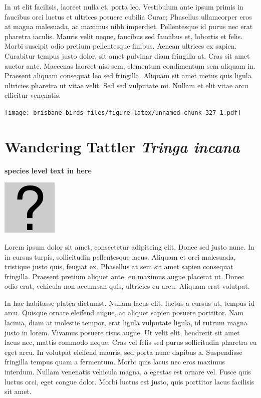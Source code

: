 \documentclass[]{book}
\let\origfigure\figure
\let\endorigfigure\endfigure
\renewenvironment{figure}[1][2] {
  \expandafter\origfigure\expandafter[H]
} {
  \endorigfigure
}
\begin{document}
In ut elit facilisis, laoreet nulla et, porta leo. Vestibulum ante ipsum
primis in faucibus orci luctus et ultrices posuere cubilia Curae;
Phasellus ullamcorper eros at magna malesuada, ac maximus nibh
imperdiet. Pellentesque id purus nec erat pharetra iaculis. Mauris velit
neque, faucibus sed faucibus et, lobortis et felis. Morbi suscipit odio
pretium pellentesque finibus. Aenean ultrices ex sapien. Curabitur
tempus justo dolor, sit amet pulvinar diam fringilla at. Cras sit amet
auctor ante. Maecenas laoreet nisi sem, elementum condimentum sem
aliquam in. Praesent aliquam consequat leo sed fringilla. Aliquam sit
amet metus quis ligula ultricies pharetra ut vitae velit. Sed sed
vulputate mi. Nullam et elit vitae arcu efficitur venenatis.

\begin{figure}
\centering
\texttt{[image: brisbane-birds\_files/figure-latex/unnamed-chunk-327-1.pdf]}
\caption{\label{fig:unnamed-chunk-327}insert figure caption}
\end{figure}

\section{\texorpdfstring{Wandering Tattler \emph{Tringa
incana}}{Wandering Tattler Tringa incana}}\label{wandering-tattler-tringa-incana}

\textbf{species level text in here}

\begin{figure}
\centering
\includegraphics{assets/missing.png}
\caption{No image for species}
\end{figure}

Lorem ipsum dolor sit amet, consectetur adipiscing elit. Donec sed justo
nunc. In in cursus turpis, sollicitudin pellentesque lacus. Aliquam et
orci malesuada, tristique justo quis, feugiat ex. Phasellus at sem sit
amet sapien consequat fringilla. Praesent pretium aliquet ante, eu
maximus augue placerat ut. Donec odio erat, vehicula non accumsan quis,
ultricies eu arcu. Aliquam erat volutpat.

In hac habitasse platea dictumst. Nullam lacus elit, luctus a cursus ut,
tempus id arcu. Quisque ornare eleifend augue, ac aliquet sapien posuere
porttitor. Nam lacinia, diam at molestie tempor, erat ligula vulputate
ligula, id rutrum magna justo in lorem. Vivamus posuere risus augue. Ut
velit elit, hendrerit sit amet lacus nec, mattis commodo neque. Cras vel
felis sed purus sollicitudin pharetra eu eget arcu. In volutpat eleifend
mauris, sed porta nunc dapibus a. Suspendisse fringilla tempus quam a
fermentum. Morbi quis lacus nec eros maximus interdum. Nullam venenatis
vehicula magna, a egestas est ornare vel. Fusce quis luctus orci, eget
congue dolor. Morbi luctus est justo, quis porttitor lacus facilisis sit
amet.
\end{document}
